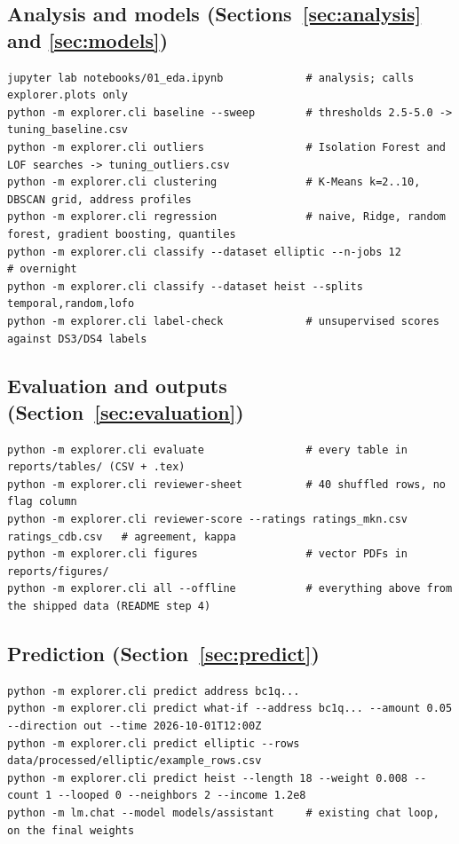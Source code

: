 \subsection{Analysis and models (Sections~\ref{sec:analysis} and \ref{sec:models})}

\begin{lstlisting}
jupyter lab notebooks/01_eda.ipynb             # analysis; calls explorer.plots only
python -m explorer.cli baseline --sweep        # thresholds 2.5-5.0 -> tuning_baseline.csv
python -m explorer.cli outliers                # Isolation Forest and LOF searches -> tuning_outliers.csv
python -m explorer.cli clustering              # K-Means k=2..10, DBSCAN grid, address profiles
python -m explorer.cli regression              # naive, Ridge, random forest, gradient boosting, quantiles
python -m explorer.cli classify --dataset elliptic --n-jobs 12        # overnight
python -m explorer.cli classify --dataset heist --splits temporal,random,lofo
python -m explorer.cli label-check             # unsupervised scores against DS3/DS4 labels
\end{lstlisting}

\subsection{Evaluation and outputs (Section~\ref{sec:evaluation})}

\begin{lstlisting}
python -m explorer.cli evaluate                # every table in reports/tables/ (CSV + .tex)
python -m explorer.cli reviewer-sheet          # 40 shuffled rows, no flag column
python -m explorer.cli reviewer-score --ratings ratings_mkn.csv ratings_cdb.csv   # agreement, kappa
python -m explorer.cli figures                 # vector PDFs in reports/figures/
python -m explorer.cli all --offline           # everything above from the shipped data (README step 4)
\end{lstlisting}

\subsection{Prediction (Section~\ref{sec:predict})}

\begin{lstlisting}
python -m explorer.cli predict address bc1q...
python -m explorer.cli predict what-if --address bc1q... --amount 0.05 --direction out --time 2026-10-01T12:00Z
python -m explorer.cli predict elliptic --rows data/processed/elliptic/example_rows.csv
python -m explorer.cli predict heist --length 18 --weight 0.008 --count 1 --looped 0 --neighbors 2 --income 1.2e8
python -m lm.chat --model models/assistant     # existing chat loop, on the final weights
\end{lstlisting}

